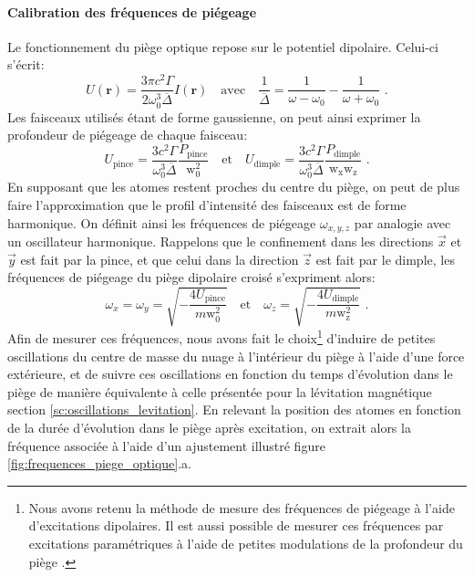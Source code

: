 \paragraph*{Calibration des fréquences de piégeage}
Le fonctionnement du piège optique repose sur le potentiel dipolaire. Celui-ci s'écrit:
\begin{equation}
U(\mathbf{r})=\frac{3 \pi c^2 \Gamma}{2 \omega_0^3 \overline{\Delta}} I(\mathbf{r}) \quad \text{avec} \quad \frac{1}{\overline{\Delta}}=\frac{1}{\omega-\omega_0}-\frac{1}{\omega+\omega_0} \text{ .}
\end{equation}
Les faisceaux utilisés étant de forme gaussienne, on peut ainsi exprimer la profondeur de piégeage de chaque faisceau:
\begin{equation}
U_{\mathrm{pince}}= \frac{3c^2 \Gamma }{\omega_0^3 \overline{\Delta}} \frac{P_{\mathrm{pince}}}{\mathrm{w}_0^2} \quad \text{et} \quad U_{\mathrm{dimple}}=\frac{3c^2 \Gamma }{\omega_0^3 \overline{\Delta}}\frac{P_{\mathrm{dimple}}}{\mathrm{w}_{\mathrm{x}} \mathrm{w}_{\mathrm{z}}} \text{ .}
\label{eq:profondeur_piege_optique}
\end{equation}
En supposant que les atomes restent proches du centre du piège, on peut de plus faire l'approximation que le profil d'intensité des faisceaux est de forme harmonique. On définit ainsi les fréquences de piégeage $\omega_{x,y,z}$ par analogie avec un oscillateur harmonique. Rappelons que le confinement dans les directions $\vec{x}$ et $\vec{y}$ est fait par la pince, et que celui dans la direction $\vec{z}$ est fait par le dimple, les fréquences de piégeage du piège dipolaire croisé s'expriment alors:
\begin{equation}
\omega_x=\omega_y=\sqrt{-\frac{4 U_{\mathrm{pince}}}{m \mathrm{w}_0^2}} \quad \text{et} \quad \omega_z=\sqrt{-\frac{4U_{\mathrm{dimple}}}{m \mathrm{w}_{\mathrm{z}}^2}} \text{ .}
\label{eq:frequences_piege_optique}
\end{equation}
Afin de mesurer ces fréquences, nous avons fait le choix\footnote{Nous avons retenu la méthode de mesure des fréquences de piégeage à l'aide d'excitations dipolaires. Il est aussi possible de mesurer ces fréquences par excitations paramétriques à l'aide de petites modulations de la profondeur du piège \citep{savard1997laser}.} d'induire de petites oscillations du centre de masse du nuage à l'intérieur du piège à l'aide d'une force extérieure, et de suivre ces oscillations en fonction du temps d'évolution dans le piège de manière équivalente à celle présentée pour la lévitation magnétique section \ref{sc:oscillations_levitation}. En relevant la position des atomes en fonction de la durée d'évolution dans le piège après excitation, on extrait alors la fréquence associée à l'aide d'un ajustement illustré figure \ref{fig:frequences_piege_optique}.a.

